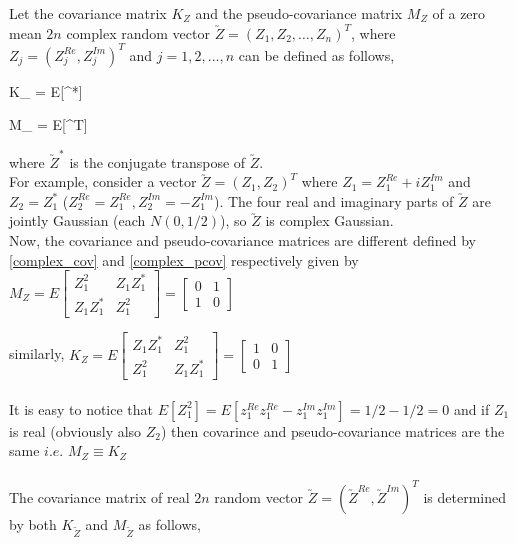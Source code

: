 Let the covariance matrix $K_Z$ and the pseudo-covariance matrix $M_Z$ of a zero mean $2n$ complex random vector $\utilde{Z} = (Z_1, Z_2, \ldots, Z_n)^T$, where $Z_j = (Z_j^{Re}, Z_j^{Im})^T$ and $j=1,2,\ldots, n$ can be defined as follows,

\beq \label{complex_cov}
K_{} = E[^*] 
\eeq

\beq \label{complex_pcov}
M_{} = E[^T]
\eeq

where $\utilde{Z}^*$ is the conjugate transpose of $\utilde{Z}$.\\

For example, consider a vector $\utilde{Z}=(Z_1, Z_2)^T$ where $Z_1=Z_1^{Re }+i Z_1^{Im}$ and $Z_2=Z_1^*$ ($Z_2^{Re}=Z_1^{Re }, Z_2^{Im}=-Z_1^{Im}$). The four real and imaginary parts of $\utilde{Z}$ are jointly Gaussian (each $N(0,1/2)$),  so $\utilde{Z}$ is complex Gaussian.\\

Now, the covariance and pseudo-covariance matrices are different defined by \ref{complex_cov} and \ref{complex_pcov} respectively given by\\

$M_Z = E \begin{bmatrix}
Z_1^2 & Z_1Z_1^*\\
Z_1Z_1^* & Z_1^2
\end{bmatrix} = 
\begin{bmatrix}
0 & 1\\
1 & 0
\end{bmatrix}$

similarly, $K_Z= E \begin{bmatrix}
Z_1Z_1^*  & Z_1^2\\
Z_1^2     & Z_1Z_1^*
\end{bmatrix} = 
\begin{bmatrix}
1 & 0\\
0 & 1
\end{bmatrix}
  $\\~\\

It is easy to notice that $E[Z_1^2] = E[z_1^{Re}z_1^{Re}-z_1^{Im}z_1^{Im}] = 1/2 -1/2 = 0$ and if $Z_1$ is real (obviously also $Z_2$) then covarince and pseudo-covariance matrices are the same $i.e.$ $M_Z \equiv K_Z$   \\~\\



The covariance matrix of real $2n$ random vector $\utilde{Z}=(\utilde{Z}^{Re}, \utilde{Z}^{Im})^T$ is determined by both $K_{\utilde{Z}}$ and $M_{\utilde{Z}}$ as follows,

